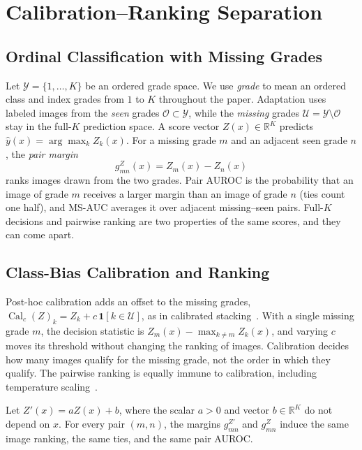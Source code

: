 \section{Calibration--Ranking Separation}
\label{sec:calibration_ranking}

\subsection{Ordinal Classification with Missing Grades}

Let $\mathcal Y=\{1,\ldots,K\}$ be an ordered grade space.
We use \emph{grade} to mean an ordered class and index grades from $1$ to $K$ throughout the paper.
Adaptation uses labeled images from the \emph{seen} grades $\mathcal O\subset\mathcal Y$, while the \emph{missing} grades $\mathcal U=\mathcal Y\setminus\mathcal O$ stay in the full-$K$ prediction space.
A score vector $Z(x)\in\mathbb R^K$ predicts $\hat y(x)=\arg\max_k Z_k(x)$.
For a missing grade $m$ and an adjacent seen grade $n$, the \emph{pair margin}
\begin{equation}
  g^{Z}_{mn}(x)=Z_m(x)-Z_n(x)
  \label{eq:pair_margin}
\end{equation}
ranks images drawn from the two grades.
Pair AUROC is the probability that an image of grade $m$ receives a larger margin than an image of grade $n$ (ties count one half), and MS-AUC averages it over adjacent missing--seen pairs.
Full-$K$ decisions and pairwise ranking are two properties of the same scores, and they can come apart.

\subsection{Class-Bias Calibration and Ranking}

Post-hoc calibration adds an offset to the missing grades, $\operatorname{Cal}_c(Z)_k=Z_k+c\,\mathbf 1[k\in\mathcal U]$, as in calibrated stacking~\cite{chao2016gzsl}.
With a single missing grade $m$, the decision statistic is $Z_m(x)-\max_{k\neq m}Z_k(x)$, and varying $c$ moves its threshold without changing the ranking of images.
Calibration decides how many images qualify for the missing grade, not the order in which they qualify.
The pairwise ranking is equally immune to calibration, including temperature scaling~\cite{guo2017calibration}.

\begin{proposition}
\label{prop:cal}
Let $Z'(x)=aZ(x)+b$, where the scalar $a>0$ and vector $b\in\mathbb R^K$ do not depend on $x$.
For every pair $(m,n)$, the margins $g_{mn}^{Z'}$ and $g_{mn}^{Z}$ induce the same image ranking, the same ties, and the same pair AUROC.
\end{proposition}

